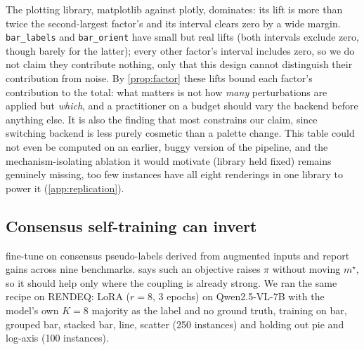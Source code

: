 \documentclass[11pt]{article}
\begin{document}
\noindent The plotting library, matplotlib against plotly, dominates: its lift is more than twice the second-largest factor's and its interval clears zero by a wide margin. \texttt{bar\_labels} and \texttt{bar\_orient} have small but real lifts (both intervals exclude zero, though barely for the latter); every other factor's interval includes zero, so we do not claim they contribute nothing, only that this design cannot distinguish their contribution from noise. By \cref{prop:factor} these lifts bound each factor's contribution to the total: what matters is not how \emph{many} perturbations are applied but \emph{which}, and a practitioner on a budget should vary the backend before anything else. It is also the finding that most constrains our claim, since switching backend is less purely cosmetic than a palette change. This table could not even be computed on an earlier, buggy version of the pipeline, and the mechanism-isolating ablation it would motivate (library held fixed) remains genuinely missing, too few instances have all eight renderings in one library to power it (\cref{app:replication}).

\subsection{Consensus self-training can invert}
\label{sec:selftraining}

\citet{kaya2026efficient} fine-tune on consensus pseudo-labels derived from augmented inputs and report gains across nine benchmarks.  says such an objective raises $\pi$ without moving $m^\star$, so it should help only where the coupling is already strong. We ran the same recipe on RENDEQ: LoRA ($r{=}8$, 3 epochs) on Qwen2.5-VL-7B with the model's own $K{=}8$ majority as the label and no ground truth, training on bar, grouped bar, stacked bar, line, scatter (250 instances) and holding out pie and log-axis (100 instances).
\end{document}
